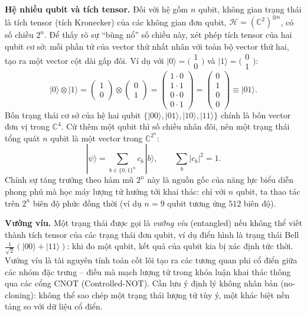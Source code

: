 \noindent\textbf{Hệ nhiều qubit và tích tensor.} Đối với hệ gồm $n$ qubit, không gian trạng thái là tích tensor (tích Kronecker) của các không gian đơn qubit, $\mathcal{H}=(\mathbb{C}^2)^{\otimes n}$, có số chiều $2^n$. Để thấy rõ sự ``bùng nổ'' số chiều này, xét phép tích tensor của hai qubit cơ sở: mỗi phần tử của vector thứ nhất nhân với toàn bộ vector thứ hai, tạo ra một vector cột dài gấp đôi. Ví dụ với $|0\rangle=\big(\begin{smallmatrix}1\\0\end{smallmatrix}\big)$ và $|1\rangle=\big(\begin{smallmatrix}0\\1\end{smallmatrix}\big)$:
\begin{equation}
    |0\rangle \otimes |1\rangle
    = \begin{pmatrix} 1 \\ 0 \end{pmatrix} \otimes \begin{pmatrix} 0 \\ 1 \end{pmatrix}
    = \begin{pmatrix} 1\cdot 0 \\ 1\cdot 1 \\ 0\cdot 0 \\ 0\cdot 1 \end{pmatrix}
    = \begin{pmatrix} 0 \\ 1 \\ 0 \\ 0 \end{pmatrix} \equiv |01\rangle .
\end{equation}
Bốn trạng thái cơ sở của hệ hai qubit $\{|00\rangle,|01\rangle,|10\rangle,|11\rangle\}$ chính là bốn vector đơn vị trong $\mathbb{C}^4$. Cứ thêm một qubit thì số chiều nhân đôi, nên một trạng thái tổng quát $n$ qubit là một vector trong $\mathbb{C}^{2^n}$:
\begin{equation}
    |\psi\rangle=\sum_{b\in\{0,1\}^n}c_b\,|b\rangle, \qquad \sum_b|c_b|^2=1 .
\end{equation}
Chính sự tăng trưởng theo hàm mũ $2^n$ này là nguồn gốc của năng lực biểu diễn phong phú mà học máy lượng tử hướng tới khai thác: chỉ với $n$ qubit, ta thao tác trên $2^n$ biên độ phức đồng thời (ví dụ $n=9$ qubit tương ứng $512$ biên độ).

\noindent\textbf{Vướng víu.} Một trạng thái được gọi là \emph{vướng víu} (entangled) nếu không thể viết thành tích tensor của các trạng thái đơn qubit, ví dụ điển hình là trạng thái Bell $\tfrac{1}{\sqrt{2}}(|00\rangle+|11\rangle)$: khi đo một qubit, kết quả của qubit kia bị xác định tức thời. Vướng víu là tài nguyên tính toán cốt lõi tạo ra các tương quan phi cổ điển giữa các nhóm đặc trưng -- điều mà mạch lượng tử trong khóa luận khai thác thông qua các cổng CNOT (Controlled-NOT). Cần lưu ý định lý không nhân bản (no-cloning): không thể sao chép một trạng thái lượng tử tùy ý, một khác biệt nền tảng so với dữ liệu cổ điển.
